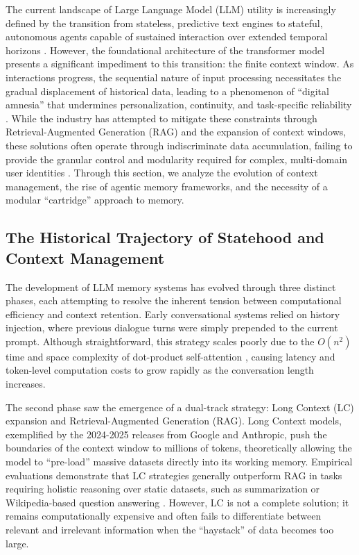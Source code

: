 \documentclass[12pt,a4paper]{article}
\begin{document}
The current landscape of Large Language Model (LLM) utility is increasingly defined by the transition from stateless, predictive text engines to stateful, autonomous agents capable of sustained interaction over extended temporal horizons \cite{luo2025large}. However, the foundational architecture of the transformer model presents a significant impediment to this transition: the finite context window. As interactions progress, the sequential nature of input processing necessitates the gradual displacement of historical data, leading to a phenomenon of ``digital amnesia'' that undermines personalization, continuity, and task-specific reliability \cite{liu2024lost}. While the industry has attempted to mitigate these constraints through Retrieval-Augmented Generation (RAG) and the expansion of context windows, these solutions often operate through indiscriminate data accumulation, failing to provide the granular control and modularity required for complex, multi-domain user identities \cite{li2025memos}. Through this section, we analyze the evolution of context management, the rise of agentic memory frameworks, and the necessity of a modular ``cartridge'' approach to memory.

\subsection{The Historical Trajectory of Statehood and Context Management}

The development of LLM memory systems has evolved through three distinct phases, each attempting to resolve the inherent tension between computational efficiency and context retention. Early conversational systems relied on history injection, where previous dialogue turns were simply prepended to the current prompt. Although straightforward, this strategy scales poorly due to the $O(n^2)$ time and space complexity of dot-product self-attention \cite{vaswani2017attention}, causing latency and token-level computation costs to grow rapidly as the conversation length increases.

The second phase saw the emergence of a dual-track strategy: Long Context (LC) expansion and Retrieval-Augmented Generation (RAG). Long Context models, exemplified by the 2024-2025 releases from Google \cite{reid2024gemini} and Anthropic, push the boundaries of the context window to millions of tokens, theoretically allowing the model to ``pre-load'' massive datasets directly into its working memory. Empirical evaluations demonstrate that LC strategies generally outperform RAG in tasks requiring holistic reasoning over static datasets, such as summarization or Wikipedia-based question answering \cite{li2024long}. However, LC is not a complete solution; it remains computationally expensive and often fails to differentiate between relevant and irrelevant information when the ``haystack'' of data becomes too large.
\end{document}
